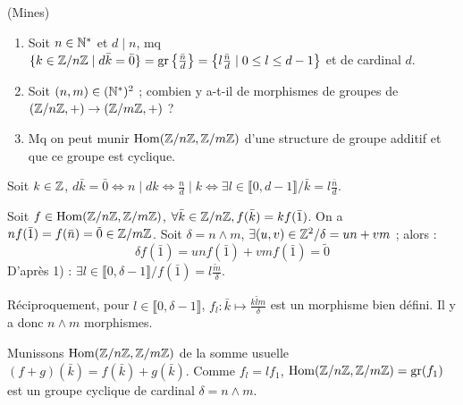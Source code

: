 
\begin{statementbox}
(Mines)
\begin{enumerate}
  \item Soit $n \in \mathbb N^*$ et $d \mid n$, mq $\{k \in \mathbb Z/n\mathbb Z \mid d\bar{k} = \bar{0}\} = \operatorname{gr}\left\{\frac{\bar{n}}{d}\right\} = \left\{l \frac{\bar{n}}{d} \mid 0 \leq l \leq d-1\right\}$ et de cardinal $d$.
  \item Soit $(n,m) \in (\mathbb N^*)^2$ ; combien y a-t-il de morphismes de groupes de $(\mathbb Z/n\mathbb Z, +) \to (\mathbb Z/m\mathbb Z, +)$ ?
  \item Mq on peut munir $\operatorname{Hom}(\mathbb Z/n\mathbb Z, \mathbb Z/m\mathbb Z)$ d'une structure de groupe additif et que ce groupe est cyclique.
\end{enumerate}
\end{statementbox}

\begin{solution}
Soit $k \in \mathbb Z$, $d\bar{k} = \bar{0} \iff n \mid dk \iff \frac{n}{d} \mid k \iff \exists l \in \llbracket 0, d-1 \rrbracket / \bar{k} = l \frac{\bar{n}}{d}$.

Soit $f \in \operatorname{Hom}(\mathbb Z/n\mathbb Z, \mathbb Z/m\mathbb Z)$, $\forall \bar{k} \in \mathbb Z/n\mathbb Z, f(\bar{k}) = k f(\bar{1})$.
On a $n f(\bar{1}) = f(\bar{n}) = \tilde{0} \in \mathbb Z/m\mathbb Z$.
Soit $\delta = n \wedge m$, $\exists (u,v) \in \mathbb Z^2 / \delta = u n + v m$ ; alors :
\[ \delta f(\bar{1}) = u n f(\bar{1}) + v m f(\bar{1}) = \tilde{0} \]
D'après 1) : $\exists l \in \llbracket 0, \delta - 1 \rrbracket / f(\bar{1}) = l \frac{\tilde{m}}{\delta}$.

Réciproquement, pour $l \in \llbracket 0, \delta - 1 \rrbracket$, $f_l : \bar{k} \mapsto \frac{\tilde{k l m}}{\delta}$ est un morphisme bien défini.
Il y a donc $\boxed{n \wedge m}$ morphismes.

Munissons $\operatorname{Hom}(\mathbb Z/n\mathbb Z, \mathbb Z/m\mathbb Z)$ de la somme usuelle $(f+g)(\bar{k}) = f(\bar{k}) + g(\bar{k})$.
Comme $f_l = l f_1$, $\operatorname{Hom}(\mathbb Z/n\mathbb Z, \mathbb Z/m\mathbb Z) = \operatorname{gr}(f_1)$ est un groupe cyclique de cardinal $\delta = n \wedge m$.
\end{solution}


